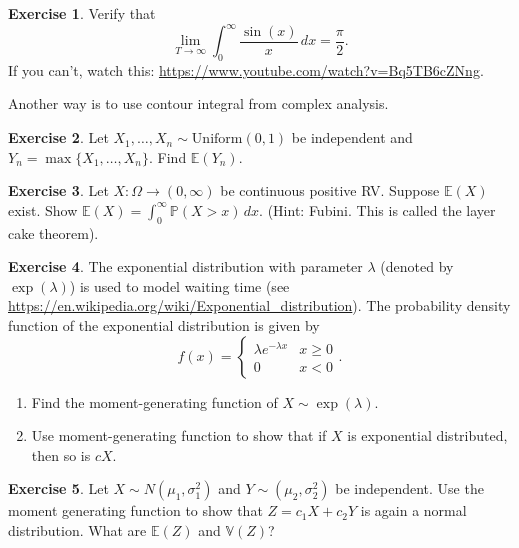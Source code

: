 \documentclass[
  openany]{book}
\theoremstyle{definition}
\theoremstyle{definition}
\theoremstyle{definition}
\newtheorem{exercise}{Exercise}[chapter]
\theoremstyle{definition}
\theoremstyle{remark}
\begin{document}
\begin{exercise}
Verify that
\[\lim_{T \to \infty} \int_0^\infty \frac{\sin(x)}{x} \, dx = \frac{\pi}{2}.\]
If you can't, watch this:
\url{https://www.youtube.com/watch?v=Bq5TB6cZNng}.

Another way is to use contour integral from complex analysis.
\end{exercise}

\begin{exercise}
Let \(X_1, \dots, X_n \sim \mathrm{Uniform}(0,1)\) be independent and \(Y_n = \max\{ X_1, \dots, X_n \}\).
Find \(\mathbb{E}(Y_n)\).
\end{exercise}

\begin{exercise}
Let \(X:\Omega \to (0,\infty)\) be continuous positive RV. Suppose \(\mathbb{E}(X)\) exist.
Show
\(\mathbb{E}(X) = \int_0^\infty \mathbb{P}(X > x) \, dx\).
(Hint: Fubini. This is called the layer cake theorem).
\end{exercise}

\begin{exercise}

The exponential distribution with parameter \(\lambda\) (denoted by \(\exp(\lambda)\))
is used to model waiting time (see \url{https://en.wikipedia.org/wiki/Exponential_distribution}).
The probability density function of the exponential distribution is given by
\[f(x) = \begin{cases} \lambda e^{-\lambda x} & x\geq 0 \\ 0 & x< 0 \end{cases}.\]

\begin{enumerate}
\def\labelenumi{\arabic{enumi}.}
\item
  Find the moment-generating function of \(X \sim \exp(\lambda)\).
\item
  Use moment-generating function to show that if \(X\) is exponential distributed,
  then so is \(cX\).
\end{enumerate}

\end{exercise}

\begin{exercise}
Let \(X \sim N(\mu_1, \sigma_1^2)\) and \(Y \sim (\mu_2, \sigma_2^2)\) be independent.
Use the moment generating function to show that \(Z = c_1 X + c_2 Y\) is again a normal distribution.
What are \(\mathbb{E}(Z)\) and \(\mathbb{V}(Z)\)?
\end{exercise}
\end{document}
